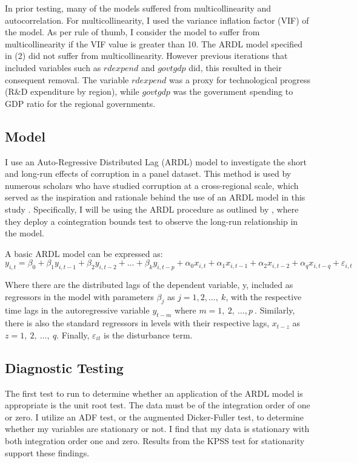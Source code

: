 \documentclass[12pt]{article} %
\begin{document}
In prior testing, many of the models suffered from multicollinearity and autocorrelation. For multicollinearity, I used the variance inflation factor (VIF) of the model. As per rule of thumb, I consider the model to suffer from multicollinearity if the VIF value is greater than 10. The ARDL model specified in (2) did not suffer from multicollinearity. However previous iterations that included variables such as $rdexpend$ and $govtgdp$ did, this resulted in their consequent removal. The variable $rdexpend$ was a proxy for technological progress (R\&D expenditure by region), while $govtgdp$ was the government spending to GDP ratio for the regional governments.


\subsection*{Model}
I use an Auto-Regressive Distributed Lag (ARDL) model to investigate the short and long-run effects of corruption in a panel dataset. This method is used by numerous scholars who have studied corruption at a cross-regional scale, which served as the inspiration and rationale behind the use of an ARDL model in this study \citep{del_monte_determinants_2007, lisciandra_economic_2016}. Specifically, I will be using the ARDL procedure as outlined by \citet{pesaran_bounds_2001}, where they deploy a cointegration bounds test to observe the long-run relationship in the model.  

A basic ARDL model can be expressed as: 
\begin{equation} \label{eu_eqn}
	y_{i,t} = \beta_{0} + \beta_{1}y_{i,t-1} + \beta_{2}y_{i,t-2} + \ldots + \beta_{k}y_{i,t-p} + \alpha_{0}x_{i,t} + \alpha_{1}x_{i,t-1} + \alpha_{2}x_{i,t-2} + \alpha_{q}x_{i,t-q} + \varepsilon_{i,t}
\end{equation} %

Where there are the distributed lags of the dependent variable, y, included as regressors in the model with parameters $ \beta_j$ as $j=1, 2,\ldots,\ k $, with the respective time lags in the autoregressive variable $ y_{t-m} $ where $ m=1,\ 2,\ \ldots,p\ $. Similarly, there is also the standard regressors in levels with their respective lags, $ x_{t-z} $ as $ z=1,\ 2,\ \ldots,\ q $. Finally, $\varepsilon_{it}$ is the disturbance term.

\subsection*{Diagnostic Testing}
\indent The first test to run to determine whether an application of the ARDL model is appropriate is the unit root test. The data must be of the integration order of one or zero. I utilize an ADF test, or the augmented Dicker-Fuller test, to determine whether my variables are stationary or not. I find that my data is stationary with both integration order one and zero. Results from the KPSS test for stationarity support these findings. 
\end{document}

